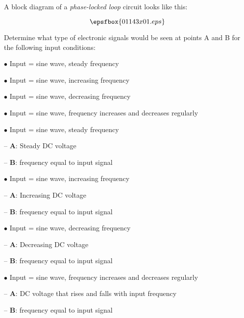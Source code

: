 

A block diagram of a {\it phase-locked loop} circuit looks like this:

$$\epsfbox{01143x01.eps}$$

Determine what type of electronic signals would be seen at points A and B for the following input conditions:

\medskip
\item{$\bullet$} Input = sine wave, steady frequency
\item{$\bullet$} Input = sine wave, increasing frequency
\item{$\bullet$} Input = sine wave, decreasing frequency
\item{$\bullet$} Input = sine wave, frequency increases and decreases regularly
\medskip







\medskip

\item{$\bullet$} Input = sine wave, steady frequency
\item{ -- } {\bf A}: Steady DC voltage 
\item{ -- } {\bf B}: frequency equal to input signal

\vskip 10pt

\item{$\bullet$} Input = sine wave, increasing frequency
\item{ -- } {\bf A}: Increasing DC voltage
\item{ -- } {\bf B}: frequency equal to input signal

\vskip 10pt

\item{$\bullet$} Input = sine wave, decreasing frequency
\item{ -- } {\bf A}: Decreasing DC voltage
\item{ -- } {\bf B}: frequency equal to input signal

\vskip 10pt

\item{$\bullet$} Input = sine wave, frequency increases and decreases regularly
\item{ -- } {\bf A}: DC voltage that rises and falls with input frequency
\item{ -- } {\bf B}: frequency equal to input signal

